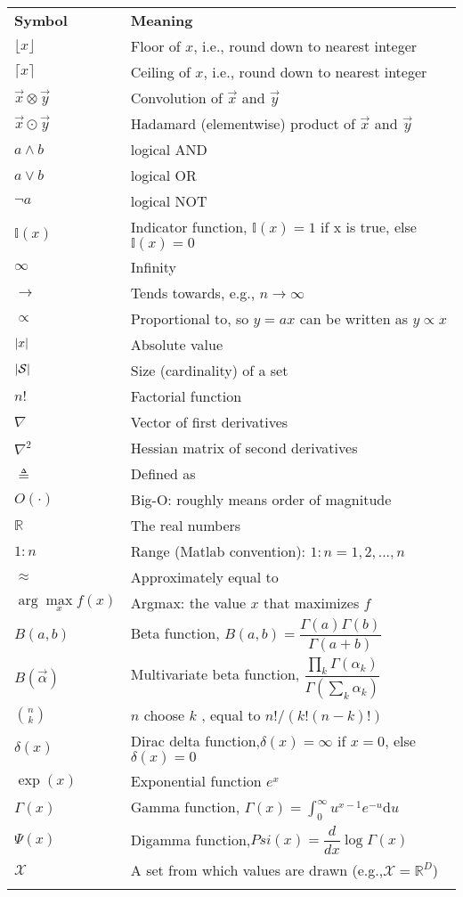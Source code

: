 \begin{longtable}{ll}
\hline\noalign{\smallskip}
\textbf{Symbol} & \textbf{Meaning} \\
\noalign{\smallskip}\hline\noalign{\smallskip}
$\lfloor x \rfloor$ & Floor of $x$, i.e., round down to nearest integer\\
$\lceil x \rceil$ & Ceiling of $x$, i.e., round down to nearest integer\\
$\vec{x} \otimes \vec{y}$ & Convolution of $\vec{x}$ and $\vec{y}$\\
$\vec{x} \odot \vec{y}$ & Hadamard (elementwise) product of $\vec{x}$ and $\vec{y}$\\
$a \wedge b$ & logical AND\\
$a \vee b$ & logical OR\\
$\neg a$ & logical NOT\\
$\mathbb{I}(x)$ & Indicator function, $\mathbb{I}(x)=1$ if x is true, else $\mathbb{I}(x)=0$\\
$\infty$ & Infinity\\
$\rightarrow$ & Tends towards, e.g., $n \rightarrow \infty$\\
$\propto$ &Proportional to, so $y = ax$ can be written as $y \propto x$\\
$\left\lvert x\right\rvert$ & Absolute value\\
$\left\lvert\mathcal{S}\right\rvert$ & Size (cardinality) of a set\\
$n!$ & Factorial function\\
$\nabla$ & Vector of first derivatives\\
$\nabla^2$ & Hessian matrix of second derivatives\\
$\triangleq$ & Defined as\\
$O(\cdot)$ & Big-O: roughly means order of magnitude\\
$\mathbb{R}$ & The real numbers\\
$1:n$ & Range (Matlab convention): $1:n = {1, 2,...,n}$\\
$\approx$ & Approximately equal to\\
$\arg\max\limits_x f(x)$ & Argmax: the value $x$ that maximizes $f$\\
$B(a,b)$ & Beta function, $B(a,b)=\dfrac{\Gamma(a)\Gamma(b)}{\Gamma(a+b)}$\\
$B(\vec{\alpha})$ & Multivariate beta function, $\dfrac{\prod\limits_k \Gamma(\alpha_k)}{\Gamma(\sum\limits_k \alpha_k)}$\\
$\binom{n}{k}$ & $n$ choose $k$ , equal to $n!/(k!(n−k )!)$\\
$\delta(x)$ & Dirac delta function,$\delta(x)=\infty$ if $x=0$, else $\delta(x)=0$\\
$\exp(x)$ & Exponential function $e^x$\\
$\Gamma(x)$ & Gamma function, $\Gamma(x)=\int_0^\infty u^{x-1}e^{-u}\mathrm{d}u$\\
$\Psi(x)$ &  Digamma function,$Psi(x)=\dfrac{d}{dx}\log\Gamma(x)$\\
$\mathcal{X}$ & A set from which values are drawn (e.g.,$\mathcal{X}=\mathbb{R}^D$)\\
\noalign{\smallskip}\hline\noalign{\smallskip}
\end{longtable}


